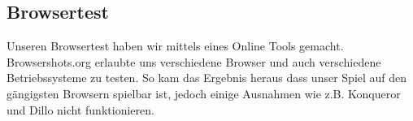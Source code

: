 \subsection{Browsertest}
Unseren Browsertest haben wir mittels eines Online Tools gemacht. Browsershots.org \cite{browsershots} erlaubte uns verschiedene Browser und auch verschiedene Betriebssysteme zu testen. So kam das Ergebnis heraus dass unser Spiel auf den gängigsten Browsern spielbar ist, jedoch einige Ausnahmen wie z.B. Konqueror und Dillo nicht funktionieren.

